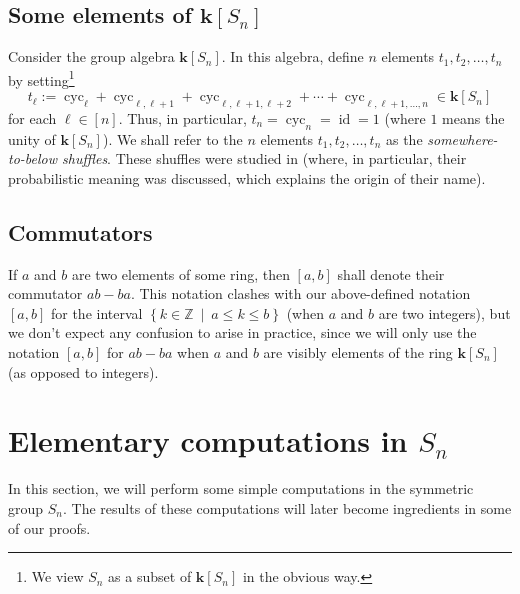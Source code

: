 \documentclass[numbers=enddot,12pt,final,onecolumn,notitlepage]{scrartcl}%
\theoremstyle{definition}
\begin{document}
\subsection{Some elements of $\mathbf{k}\left[  S_{n}\right]  $}

Consider the group algebra $\mathbf{k}\left[  S_{n}\right]  $. In this
algebra, define $n$ elements $t_{1},t_{2},\ldots,t_{n}$ by setting\footnote{We
view $S_{n}$ as a subset of $\mathbf{k}\left[  S_{n}\right]  $ in the obvious
way.}%
\begin{equation}
t_{\ell}:=\operatorname*{cyc}\nolimits_{\ell}+\operatorname*{cyc}%
\nolimits_{\ell,\ell+1}+\operatorname*{cyc}\nolimits_{\ell,\ell+1,\ell
+2}+\cdots+\operatorname*{cyc}\nolimits_{\ell,\ell+1,\ldots,n}\in
\mathbf{k}\left[  S_{n}\right]  \label{eq.def.tl.deftl}%
\end{equation}
for each $\ell\in\left[  n\right]  $. Thus, in particular, $t_{n}%
=\operatorname*{cyc}\nolimits_{n}=\operatorname*{id}=1$ (where $1$ means the
unity of $\mathbf{k}\left[  S_{n}\right]  $). We shall refer to the $n$
elements $t_{1},t_{2},\ldots,t_{n}$ as the \emph{somewhere-to-below shuffles}.
These shuffles were studied in \cite{s2b1} (where, in particular, their
probabilistic meaning was discussed, which explains the origin of their name).

\subsection{Commutators}

If $a$ and $b$ are two elements of some ring, then $\left[  a,b\right]  $
shall denote their commutator $ab-ba$. This notation clashes with our
above-defined notation $\left[  a,b\right]  $ for the interval $\left\{
k\in\mathbb{Z}\ \mid\ a\leq k\leq b\right\}  $ (when $a$ and $b$ are two
integers), but we don't expect any confusion to arise in practice, since we
will only use the notation $\left[  a,b\right]  $ for $ab-ba$ when $a$ and $b$
are visibly elements of the ring $\mathbf{k}\left[  S_{n}\right]  $ (as
opposed to integers).

\section{Elementary computations in $S_{n}$}

In this section, we will perform some simple computations in the symmetric
group $S_{n}$. The results of these computations will later become ingredients
in some of our proofs.
\end{document}
